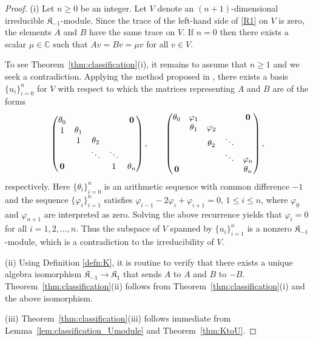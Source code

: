 \documentclass[pdftex]{sigma}%
\def\C{\mathbb C}
\numberwithin{equation}{section}
\begin{document}
\begin{proof}
(i) Let $n\geq 0$ be an integer. Let $V$ denote an $(n+1)$-dimensional irreducible $\mathfrak{K}_{-1}$-module. Since the trace of the left-hand side of \eqref{R1} on $V$ is zero, the elements $A$ and $B$ have the same trace on $V$. If $n=0$ then there exists a scalar $\mu\in \C$ such that $Av=Bv=\mu v$ for all $v\in V$.

To see Theorem~\ref{thm:classification}(i), it remains to assume that $n\geq 1$ and we seek a contradiction. Applying the method proposed in \cite{Huang:2015,Huang:BImodule,SH:2019-1}, there exists a basis $\{u_i\}_{i=0}^n$ for $V$ with respect to which the matrices representing $A$ and $B$ are of the forms
\begin{gather*}\setlength{\tabcolsep}{2.0pt}%
\begin{pmatrix}
\theta_0 & & & &{\bf 0}
\\
1 &\theta_1
\\
&1 &\theta_2
 \\
& &\ddots &\ddots
 \\
{\bf 0} & & &1 &\theta_n
\end{pmatrix},
\qquad
\begin{pmatrix}
\theta_0 &\varphi_1 & & &{\bf 0}
\\
 &\theta_1 &\varphi_2
\\
 & &\theta_2 &\ddots
 \\
 & & &\ddots &\varphi_n
 \\
{\bf 0} & & & &\theta_n
\end{pmatrix},
\end{gather*}
respectively. Here $\{\theta_i\}_{i=0}^n$ is an arithmetic sequence with common difference $-1$ and the sequence $\{\varphi_i\}_{i=1}^n$ satisfies
$\varphi_{i-1}-2\varphi_i+\varphi_{i+1}=0$, $1\leq i\leq n$,
where $\varphi_0$ and $\varphi_{n+1}$ are interpreted as zero. Solving the above recurrence yields that $\varphi_i=0$ for all $i=1,2,\dots,n$. Thus the subspace of $V$ spanned by $\{u_i\}_{i=1}^n$ is a nonzero $\mathfrak{K}_{-1}$-module, which is a contradiction to the irreducibility of $V$.

(ii) Using Definition \ref{defn:K}, it is routine to verify that there exists a unique algebra isomorphism $\mathfrak K_{-1}\to \mathfrak K_1$ that sends $A$ to $A$ and $B$ to $-B$.
Theorem~\ref{thm:classification}(ii) follows from Theorem~\ref{thm:classification}(i) and the above isomorphism.

(iii) Theorem~\ref{thm:classification}(iii) follows immediate from Lemma~\ref{lem:classification_Umodule} and Theorem~\ref{thm:KtoU}.
\end{proof}
\end{document}
